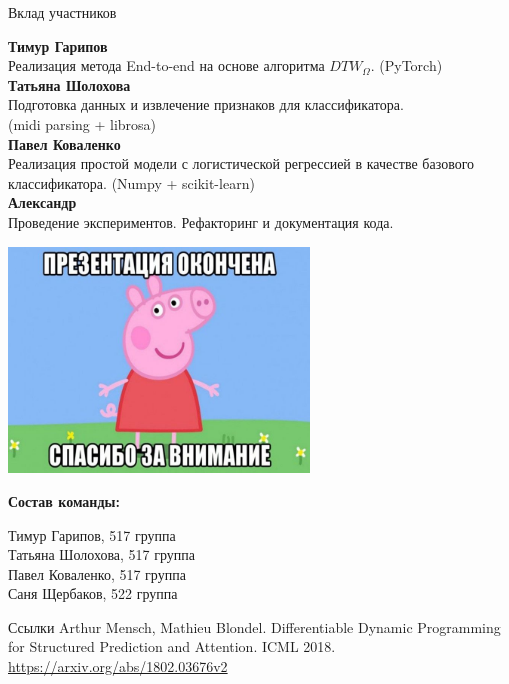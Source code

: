 \documentclass[unicode, dvipsnames]{beamer}
\begin{document}
\begin{frame}{Вклад участников}

{\bfseries Тимур Гарипов}\\ 

Реализация метода End-to-end на основе алгоритма $DTW_{\Omega}$. (PyTorch)\\
\bigskip
{\bfseries Татьяна Шолохова}\\ 

Подготовка данных и извлечение признаков для классификатора.\\(midi parsing + librosa)\\
\bigskip
{\bfseries Павел Коваленко}\\

Реализация простой модели с логистической регрессией в качестве базового классификатора. (Numpy + scikit-learn)\\
\bigskip
{\bfseries Александр} \\
Проведение экспериментов. Рефакторинг и документация кода.

\end{frame}

\begin{frame}{}

\centering
\includegraphics[width=0.6\textwidth]{graphics/final.jpg}

\bigskip
\textbf{Состав команды:}

Тимур Гарипов, 517 группа \\ Татьяна Шолохова, 517 группа \\ Павел Коваленко, 517 группа \\ Саня Щербаков, 522 группа

\end{frame}

\begin{frame}{Ссылки}
 Arthur Mensch, Mathieu Blondel. Differentiable Dynamic Programming for Structured Prediction and Attention. ICML 2018. \url{https://arxiv.org/abs/1802.03676v2}
	
\end{frame}
\end{document}
